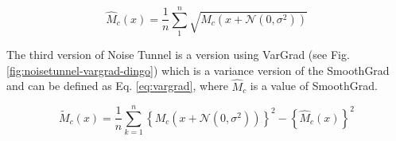\begin{equation}
\hat{M}_{c}(x)=\frac{1}{n} \sum_{1}^{n} \sqrt{M_{c}\left(x+\mathcal{N}\left(0, \sigma^{2}\right)\right)}
\label{eq:smoothgrad-sq}
\end{equation}

The third version of Noise Tunnel is a version using VarGrad (see Fig. \ref{fig:noisetunnel-vargrad-dingo}) which is a variance version of the SmoothGrad and can be defined as Eq. \ref{eq:vargrad}, where $\hat{M}_c$ is a value of SmoothGrad. 

\begin{equation}
\tilde{M}_{c}(x)=\frac{1}{n} \sum_{k=1}^{n}\left\{M_{c}\left(x+\mathcal{N}\left(0, \sigma^{2}\right)\right)\right\}^{2}-\left\{\hat{M}_{c}(x)\right\}^{2}
\label{eq:vargrad}
\end{equation}

